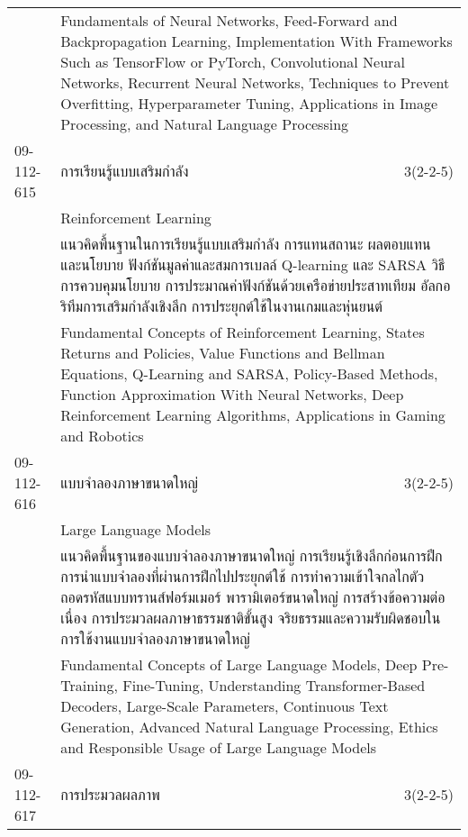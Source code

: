 \begin{longtable}{p{}p{}r{}}
&  \multicolumn{2}{p{0.75\textwidth}}{Fundamentals of Neural Networks, Feed-Forward and Backpropagation Learning, Implementation With Frameworks Such as TensorFlow or PyTorch, Convolutional Neural Networks, Recurrent Neural Networks, Techniques to Prevent Overfitting, Hyperparameter Tuning, Applications in Image Processing, and Natural Language Processing} \vspace{8mm} \\*
09-112-615 & การเรียนรู้แบบเสริมกำลัง & 3(2-2-5)\\*
 & Reinforcement Learning & \phantom{x} \vspace{3mm} \\*
&  \multicolumn{2}{p{0.75\textwidth}}{แนวคิดพื้นฐานในการเรียนรู้แบบเสริมกำลัง การแทนสถานะ ผลตอบแทน และนโยบาย ฟังก์ชันมูลค่าและสมการเบลล์ Q-learning และ SARSA วิธีการควบคุมนโยบาย การประมาณค่าฟังก์ชันด้วยเครือข่ายประสาทเทียม อัลกอริทึมการเสริมกำลังเชิงลึก การประยุกต์ใช้ในงานเกมและหุ่นยนต์} \vspace{3mm} \\*
&  \multicolumn{2}{p{0.75\textwidth}}{Fundamental Concepts of Reinforcement Learning, States Returns and Policies, Value Functions and Bellman Equations, Q-Learning and SARSA, Policy-Based Methods, Function Approximation With Neural Networks, Deep Reinforcement Learning Algorithms, Applications in Gaming and Robotics} \vspace{8mm} \\*
09-112-616 & แบบจำลองภาษาขนาดใหญ่ & 3(2-2-5)\\*
 & Large Language Models & \phantom{x} \vspace{3mm} \\*
&  \multicolumn{2}{p{0.75\textwidth}}{แนวคิดพื้นฐานของแบบจำลองภาษาขนาดใหญ่ การเรียนรู้เชิงลึกก่อนการฝึก การนำแบบจำลองที่ผ่านการฝึกไปประยุกต์ใช้ การทำความเข้าใจกลไกตัวถอดรหัสแบบทรานส์ฟอร์มเมอร์ พารามิเตอร์ขนาดใหญ่ การสร้างข้อความต่อเนื่อง การประมวลผลภาษาธรรมชาติขั้นสูง จริยธรรมและความรับผิดชอบในการใช้งานแบบจำลองภาษาขนาดใหญ่} \vspace{3mm} \\*
&  \multicolumn{2}{p{0.75\textwidth}}{Fundamental Concepts of Large Language Models, Deep Pre-Training, Fine-Tuning, Understanding Transformer-Based Decoders, Large-Scale Parameters, Continuous Text Generation, Advanced Natural Language Processing, Ethics and Responsible Usage of Large Language Models} \vspace{8mm} \\*
09-112-617 & การประมวลผลภาพ & 3(2-2-5)\\*

\end{longtable}
